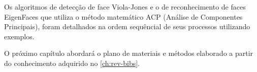 Os algoritmos de detecção de face Viola-Jones e o de reconhecimento de faces EigenFaces que utiliza o método matemático ACP (Análise de Componentes Principais), foram detalhados na ordem sequêncial de seus processos utilizando exemplos.

O próximo capítulo abordará o plano de materiais e métodos elaborado a partir do conhecimento adquirido no \autoref{ch:rev-bibs}.























